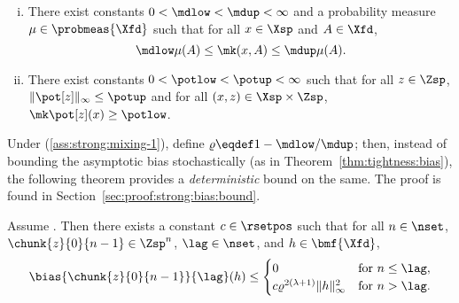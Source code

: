 \begin{hypB} \label{ass:strong:mixing}
    \begin{enumerate}[(i)]
    \item \label{ass:strong:mixing-1} There exist constants $0 < \mdlow < \mdup < \infty$ and a probability measure $\mu \in \probmeas{\Xfd}$ such that for all $x \in \Xsp$ and $A \in \Xfd$, 
    $$
        \mdlow \mu(A) \leq \mk(x, A) \leq \mdup \mu(A).
    $$
    \item \label{ass:strong:mixing-2} There exist constants $0 < \potlow < \potup < \infty$ such that for all $z \in \Zsp$, $\| \pot[z] \|_\infty \leq \potup$ and for all $(x, z) \in \Xsp \times \Zsp$, $\mk \pot[z](x) \geq \potlow$.
    \end{enumerate}
\end{hypB}

Under (\ref{ass:strong:mixing-1}), define $\varrho \eqdef 1 - \mdlow / \mdup$; then, instead of bounding the asymptotic bias stochastically (as in Theorem~\ref{thm:tightness:bias}), the following theorem provides a \emph{deterministic} bound on the same. The proof is found in Section~\ref{sec:proof:strong:bias:bound}. 

\begin{theorem} \label{thm:strong:bias:bound}
Assume . Then there exists a constant $c \in \rsetpos$ such that for all $n \in \nset$, $\chunk{z}{0}{n - 1} \in \Zsp^n$, $\lag \in \nset$, and $h \in \bmf{\Xfd}$, 
\begin{equation*} \label{eq:strong:bias:bound}
\bias{\chunk{z}{0}{n - 1}}{\lag}(h) \leq 
\begin{cases} 
0 & \mbox{for } n \leq \lag, \\
c \varrho^{2(\lambda + 1)} \| h \|_{\infty}^2 & \mbox{for } n > \lag. 
\end{cases} 
\end{equation*}
\end{theorem}
















